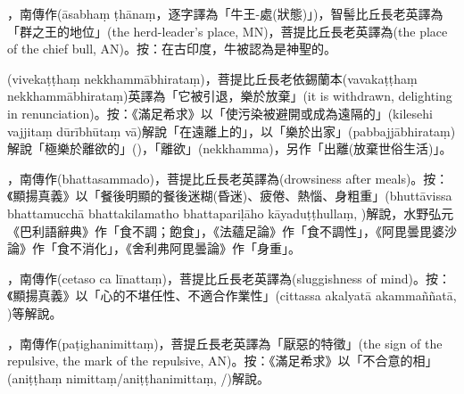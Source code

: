 \startitemgroup[noteitems]
\item{}，南傳作(āsabhaṃ ṭhānaṃ，逐字譯為「牛王-處(狀態)」)，智髻比丘長老英譯為「群之王的地位」(the herd-leader's place, MN)，菩提比丘長老英譯為(the place of the chief bull, AN)。按：在古印度，牛被認為是神聖的。
\stopitemgroup

\startitemgroup[noteitems]
\item{}(vivekaṭṭhaṃ nekkhammābhirataṃ)，菩提比丘長老依錫蘭本(vavakaṭṭhaṃ nekkhammābhirataṃ)英譯為「它被引退，樂於放棄」(it is withdrawn, delighting in renunciation)。按：《滿足希求》以「使污染被避開或成為遠隔的」(kilesehi vajjitaṃ dūrībhūtaṃ vā)解說「在遠離上的」，以「樂於出家」(pabbajjābhirataṃ)解說「極樂於離欲的」()，「離欲」(nekkhamma)，另作「出離(放棄世俗生活)」。
\stopitemgroup

\startitemgroup[noteitems]
\item{}，南傳作(bhattasammado)，菩提比丘長老英譯為(drowsiness after meals)。按：《顯揚真義》以「餐後明顯的餐後迷糊(昏迷)、疲倦、熱惱、身粗重」(bhuttāvissa bhattamucchā bhattakilamatho bhattapariḷāho kāyaduṭṭhullaṃ, )解說，水野弘元《巴利語辭典》作「食不調；飽食」，《法蘊足論》作「食不調性」，《阿毘曇毘婆沙論》作「食不消化」，《舍利弗阿毘曇論》作「身重」。
\item{}，南傳作(cetaso ca līnattaṃ)，菩提比丘長老英譯為(sluggishness of mind)。按：《顯揚真義》以「心的不堪任性、不適合作業性」(cittassa akalyatā akammaññatā, )等解說。
\stopitemgroup

\startitemgroup[noteitems]
\item{}，南傳作(paṭighanimittaṃ)，菩提丘長老英譯為「厭惡的特徵」(the sign of the repulsive, the mark of the repulsive, AN)。按：《滿足希求》以「不合意的相」(aniṭṭhaṃ nimittaṃ/aniṭṭhanimittaṃ, /)解說。
\stopitemgroup

